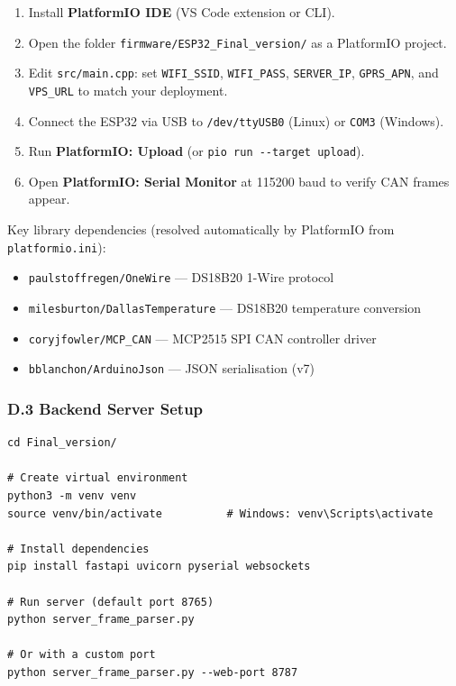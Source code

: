 \begin{enumerate}
  \item Install \textbf{PlatformIO IDE} (VS Code extension or CLI).
  \item Open the folder \texttt{firmware/ESP32\_Final\_version/} as a PlatformIO project.
  \item Edit \texttt{src/main.cpp}: set \texttt{WIFI\_SSID}, \texttt{WIFI\_PASS}, \texttt{SERVER\_IP}, \texttt{GPRS\_APN}, and \texttt{VPS\_URL} to match your deployment.
  \item Connect the ESP32 via USB to \texttt{/dev/ttyUSB0} (Linux) or \texttt{COM3} (Windows).
  \item Run \textbf{PlatformIO: Upload} (or \texttt{pio run -{}-target upload}).
  \item Open \textbf{PlatformIO: Serial Monitor} at 115200 baud to verify CAN frames appear.
\end{enumerate}

Key library dependencies (resolved automatically by PlatformIO from \texttt{platformio.ini}):
\begin{itemize}
  \item \texttt{paulstoffregen/OneWire} --- DS18B20 1-Wire protocol
  \item \texttt{milesburton/DallasTemperature} --- DS18B20 temperature conversion
  \item \texttt{coryjfowler/MCP\_CAN} --- MCP2515 SPI CAN controller driver
  \item \texttt{bblanchon/ArduinoJson} --- JSON serialisation (v7)
\end{itemize}

\subsubsection*{D.3 \quad Backend Server Setup}

\begin{lstlisting}[style=filetree, caption={Backend installation commands}]
cd Final_version/

# Create virtual environment
python3 -m venv venv
source venv/bin/activate          # Windows: venv\Scripts\activate

# Install dependencies
pip install fastapi uvicorn pyserial websockets

# Run server (default port 8765)
python server_frame_parser.py

# Or with a custom port
python server_frame_parser.py --web-port 8787
\end{lstlisting}

